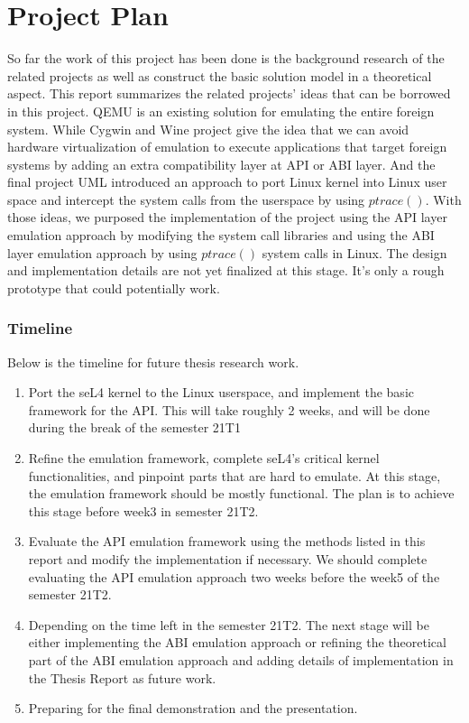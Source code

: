 \chapter{Project Plan}\label{ch:projplan}

So far the work of this project has been done is the background research of the related projects as well as construct the basic solution model in a theoretical aspect. This report summarizes the related projects' ideas that can be borrowed in this project. QEMU is an existing solution for emulating the entire foreign system. While Cygwin and Wine project give the idea that we can avoid hardware virtualization of emulation to execute applications that target foreign systems by adding an extra compatibility layer at API or ABI layer. And the final project UML introduced an approach to port Linux kernel into Linux user space and intercept the system calls from the userspace by using $ptrace()$. With those ideas, we purposed the implementation of the project using the API layer emulation approach by modifying the system call libraries and using the ABI layer emulation approach by using $ptrace()$ system calls in Linux. The design and implementation details are not yet finalized at this stage. It's only a rough prototype that could potentially work. 

\subsection{Timeline}
Below is the timeline for future thesis research work.

\begin{enumerate}
    \item Port the seL4 kernel to the Linux userspace, and implement the basic framework for the API. This will take roughly 2 weeks, and will be done during the break of the semester 21T1
    \item Refine the emulation framework, complete seL4's critical kernel functionalities, and pinpoint parts that are hard to emulate. At this stage, the emulation framework should be mostly functional. The plan is to achieve this stage before week3 in semester 21T2.
    \item Evaluate the API emulation framework using the methods listed in this report and modify the implementation if necessary. We should complete evaluating the API emulation approach two weeks before the week5 of the semester 21T2.
    \item Depending on the time left in the semester 21T2. The next stage will be either implementing the ABI emulation approach or refining the theoretical part of the ABI emulation approach and adding details of implementation in the Thesis Report as future work.
    \item Preparing for the final demonstration and the presentation.
\end{enumerate}